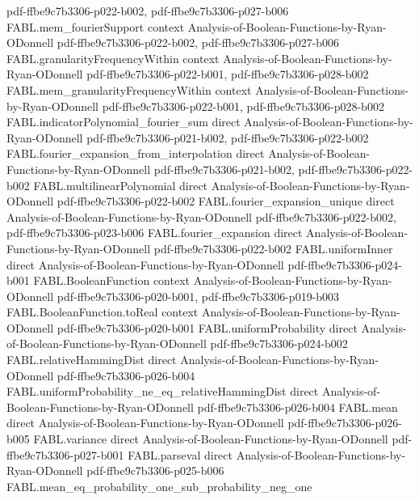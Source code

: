 \begin{theorem}
  {pdf-ffbe9c7b3306-p022-b002,
    pdf-ffbe9c7b3306-p027-b006}
\proofstep
  {FABL.mem_fourierSupport}
  {context}
  {Analysis-of-Boolean-Functions-by-Ryan-ODonnell}
  {pdf-ffbe9c7b3306-p022-b002,
    pdf-ffbe9c7b3306-p027-b006}
\proofstep
  {FABL.granularityFrequencyWithin}
  {context}
  {Analysis-of-Boolean-Functions-by-Ryan-ODonnell}
  {pdf-ffbe9c7b3306-p022-b001,
    pdf-ffbe9c7b3306-p028-b002}
\proofstep
  {FABL.mem_granularityFrequencyWithin}
  {context}
  {Analysis-of-Boolean-Functions-by-Ryan-ODonnell}
  {pdf-ffbe9c7b3306-p022-b001,
    pdf-ffbe9c7b3306-p028-b002}
\proofstep
  {FABL.indicatorPolynomial_fourier_sum}
  {direct}
  {Analysis-of-Boolean-Functions-by-Ryan-ODonnell}
  {pdf-ffbe9c7b3306-p021-b002,
    pdf-ffbe9c7b3306-p022-b002}
\proofstep
  {FABL.fourier_expansion_from_interpolation}
  {direct}
  {Analysis-of-Boolean-Functions-by-Ryan-ODonnell}
  {pdf-ffbe9c7b3306-p021-b002,
    pdf-ffbe9c7b3306-p022-b002}
\proofstep
  {FABL.multilinearPolynomial}
  {direct}
  {Analysis-of-Boolean-Functions-by-Ryan-ODonnell}
  {pdf-ffbe9c7b3306-p022-b002}
\proofstep
  {FABL.fourier_expansion_unique}
  {direct}
  {Analysis-of-Boolean-Functions-by-Ryan-ODonnell}
  {pdf-ffbe9c7b3306-p022-b002,
    pdf-ffbe9c7b3306-p023-b006}
\proofstep
  {FABL.fourier_expansion}
  {direct}
  {Analysis-of-Boolean-Functions-by-Ryan-ODonnell}
  {pdf-ffbe9c7b3306-p022-b002}
\proofstep
  {FABL.uniformInner}
  {direct}
  {Analysis-of-Boolean-Functions-by-Ryan-ODonnell}
  {pdf-ffbe9c7b3306-p024-b001}
\proofstep
  {FABL.BooleanFunction}
  {context}
  {Analysis-of-Boolean-Functions-by-Ryan-ODonnell}
  {pdf-ffbe9c7b3306-p020-b001,
    pdf-ffbe9c7b3306-p019-b003}
\proofstep
  {FABL.BooleanFunction.toReal}
  {context}
  {Analysis-of-Boolean-Functions-by-Ryan-ODonnell}
  {pdf-ffbe9c7b3306-p020-b001}
\proofstep
  {FABL.uniformProbability}
  {direct}
  {Analysis-of-Boolean-Functions-by-Ryan-ODonnell}
  {pdf-ffbe9c7b3306-p024-b002}
\proofstep
  {FABL.relativeHammingDist}
  {direct}
  {Analysis-of-Boolean-Functions-by-Ryan-ODonnell}
  {pdf-ffbe9c7b3306-p026-b004}
\proofstep
  {FABL.uniformProbability_ne_eq_relativeHammingDist}
  {direct}
  {Analysis-of-Boolean-Functions-by-Ryan-ODonnell}
  {pdf-ffbe9c7b3306-p026-b004}
\proofstep
  {FABL.mean}
  {direct}
  {Analysis-of-Boolean-Functions-by-Ryan-ODonnell}
  {pdf-ffbe9c7b3306-p026-b005}
\proofstep
  {FABL.variance}
  {direct}
  {Analysis-of-Boolean-Functions-by-Ryan-ODonnell}
  {pdf-ffbe9c7b3306-p027-b001}
\proofstep
  {FABL.parseval}
  {direct}
  {Analysis-of-Boolean-Functions-by-Ryan-ODonnell}
  {pdf-ffbe9c7b3306-p025-b006}
\proofstep
  {FABL.mean_eq_probability_one_sub_probability_neg_one}

\end{theorem}
